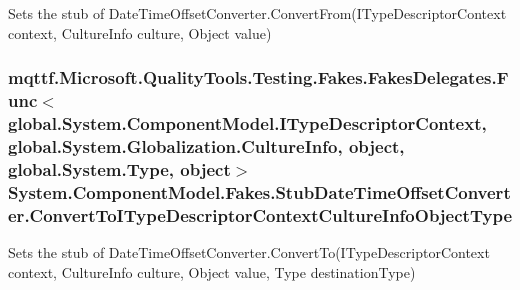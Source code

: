 Sets the stub of Date\-Time\-Offset\-Converter.\-Convert\-From(\-I\-Type\-Descriptor\-Context context, Culture\-Info culture, Object value)

\hypertarget{class_system_1_1_component_model_1_1_fakes_1_1_stub_date_time_offset_converter_aa7213647315507630df380591db6950f}{
\subsubsection[{Convert\-To\-I\-Type\-Descriptor\-Context\-Culture\-Info\-Object\-Type}]{\setlength{\rightskip}{0pt plus 5cm}mqttf.\-Microsoft.\-Quality\-Tools.\-Testing.\-Fakes.\-Fakes\-Delegates.\-Func$<$global.\-System.\-Component\-Model.\-I\-Type\-Descriptor\-Context, global.\-System.\-Globalization.\-Culture\-Info, object, global.\-System.\-Type, object$>$ System.\-Component\-Model.\-Fakes.\-Stub\-Date\-Time\-Offset\-Converter.\-Convert\-To\-I\-Type\-Descriptor\-Context\-Culture\-Info\-Object\-Type}}\label{class_system_1_1_component_model_1_1_fakes_1_1_stub_date_time_offset_converter_aa7213647315507630df380591db6950f}


Sets the stub of Date\-Time\-Offset\-Converter.\-Convert\-To(\-I\-Type\-Descriptor\-Context context, Culture\-Info culture, Object value, Type destination\-Type)

